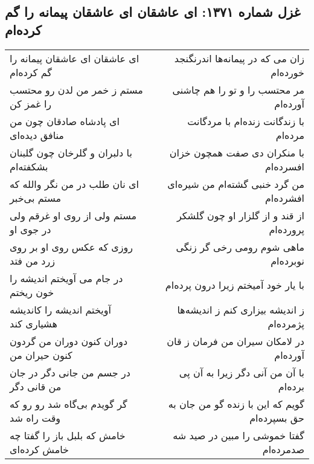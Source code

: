 \begin{center}
\section*{غزل شماره ۱۳۷۱: ای عاشقان ای عاشقان پیمانه را گم کرده‌ام}
\label{sec:1371}
\begin{longtable}{l p{0.5cm} r}
ای عاشقان ای عاشقان پیمانه را گم کرده‌ام
&&
زان می که در پیمانه‌ها اندرنگنجد خورده‌ام
\\
مستم ز خمر من لدن رو محتسب را غمز کن
&&
مر محتسب را و تو را هم چاشنی آورده‌ام
\\
ای پادشاه صادقان چون من منافق دیده‌ای
&&
با زندگانت زنده‌ام با مردگانت مرده‌ام
\\
با دلبران و گلرخان چون گلبنان بشکفته‌ام
&&
با منکران دی صفت همچون خزان افسرده‌ام
\\
ای نان طلب در من نگر والله که مستم بی‌خبر
&&
من گرد خنبی گشته‌ام من شیره‌ای افشرده‌ام
\\
مستم ولی از روی او غرقم ولی در جوی او
&&
از قند و از گلزار او چون گلشکر پرورده‌ام
\\
روزی که عکس روی او بر روی زرد من فتد
&&
ماهی شوم رومی رخی گر زنگی نوبرده‌ام
\\
در جام می آویختم اندیشه را خون ریختم
&&
با یار خود آمیختم زیرا درون پرده‌ام
\\
آویختم اندیشه را کاندیشه هشیاری کند
&&
ز اندیشه بیزاری کنم ز اندیشه‌ها پژمرده‌ام
\\
دوران کنون دوران من گردون کنون حیران من
&&
در لامکان سیران من فرمان ز قان آورده‌ام
\\
در جسم من جانی دگر در جان من قانی دگر
&&
با آن من آنی دگر زیرا به آن پی برده‌ام
\\
گر گویدم بی‌گاه شد رو رو که وقت راه شد
&&
گویم که این با زنده گو من جان به حق بسپرده‌ام
\\
خامش که بلبل باز را گفتا چه خامش کرده‌ای
&&
گفتا خموشی را مبین در صید شه صدمرده‌ام
\\
\end{longtable}
\end{center}
